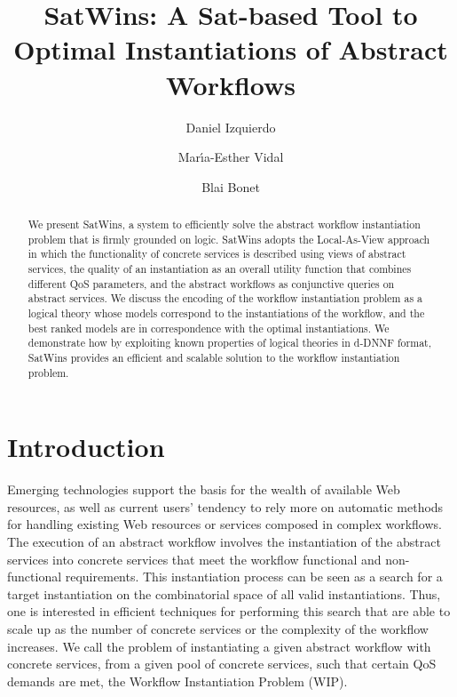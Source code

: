 \documentclass{llncs}
\begin{document}
\allowdisplaybreaks
\title{SatWins: A Sat-based Tool to Optimal Instantiations of Abstract Workflows}
\author{Daniel Izquierdo \and Mar\'{\i}a-Esther Vidal \and Blai Bonet}
\maketitle

\begin{abstract}
We present SatWins, a system to efficiently solve the abstract workflow
instantiation problem that is firmly grounded on logic.
SatWins adopts the Local-As-View approach in which
the functionality of concrete services is described using views
of abstract services, the quality of an instantiation as an
overall utility function that combines different QoS parameters,
and the abstract workflows as conjunctive queries on abstract services.
We discuss the encoding of the workflow instantiation problem as a logical theory whose models
correspond to the instantiations of the workflow,
and the best ranked models are in correspondence with the
optimal instantiations. We demonstrate how by exploiting known properties of logical theories in 
d-DNNF format, SatWins provides an efficient and scalable solution
to the workflow instantiation problem. 
\end{abstract}

\section{Introduction}
Emerging technologies support the basis for the wealth of available Web resources, as well as current users' tendency to rely more on automatic methods for handling existing Web resources or services composed in complex workflows. The execution of an abstract workflow involves the instantiation
of the abstract services into concrete services that meet the workflow
functional and non-functional requirements. This instantiation
process can be seen as a search for a target instantiation on
the combinatorial space of all valid instantiations.
Thus, one is interested in efficient techniques for performing
this search that are able to scale up as the number of concrete
services or the complexity of the workflow increases. We call the problem of instantiating a given abstract workflow with concrete services, from a given pool of concrete services,
such that certain QoS demands are met, the Workflow Instantiation
Problem (WIP). 
\end{document}
